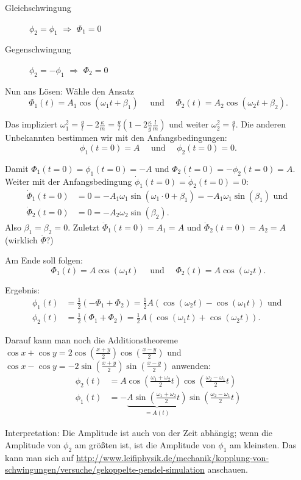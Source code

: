 \begin{description}
	\item[Gleichschwingung] $\phi_2 = \phi_1$ $\Longrightarrow$ $\Phi_1 = 0$
	\item[Gegenschwingung] $\phi_2 = -\phi_1$ $\Longrightarrow$ $\Phi_2 = 0$ 
\end{description}

Nun ans Lösen: Wähle den Ansatz 
\[
	\Phi_1(t) = A_1 \cos (\omega_1 t + \beta_1) 
	\quad \text{ und } \quad 
	\Phi_2(t) = A_2 \cos (\omega_2 t + \beta_2)
	\text{.}
\]

Das impliziert $\omega_1^2 = \frac{g}{l} - 2 \frac{\kappa}{m} = \frac{g}{l} \left( 1 - 2 \frac{\kappa}{g} \frac{l}{m} \right)$ und weiter $\omega_2^2 = \frac{g}{l}$. Die anderen Unbekannten bestimmen wir mit den Anfangsbedingungen:
\[
	\phi_1(t = 0) = A
	\quad \text{ und } \quad 
	\phi_2(t = 0) = 0
	\text{.}
\]

Damit $\Phi_1(t = 0) = \phi_1(t = 0) = -A$ und $\Phi_2(t = 0) = - \phi_2(t = 0) = A$. Weiter mit der Anfangsbedingung $\dot{\phi}_1(t = 0) = \dot{\phi}_2(t = 0) = 0$: 
\begin{align*}
	\dot{\Phi}_1(t = 0) &= 0 
	= - A_1 \omega_1 \sin (\omega_1 \cdot 0 + \beta_1) 
	= - A_1 \omega_1 \sin(\beta_1) \text{ und } \\
	\dot{\Phi}_2(t = 0) &= 0 
	= -A_2 \omega_2 \sin(\beta_2) \text{.}
\end{align*}
Also $\beta_1 = \beta_2 = 0$. Zuletzt $\ddot{\Phi}_1(t = 0) = A_1 = A$ und $\ddot{\Phi}_2(t = 0) = A_2 = A$ (wirklich $\ddot{\Phi}$?) 

Am Ende soll folgen: 
\[
	\Phi_1(t) = A \cos (\omega_1 t) 
	\quad \text{ und } \quad 
	\Phi_2(t) = A \cos (\omega_2 t)
	\text{.}
\]

Ergebnis:
\begin{align*}
	\phi_1(t) &= \frac{1}{2} (- \Phi_1 + \Phi_2) = \frac{1}{2} A (\cos(\omega_2 t) - \cos(\omega_1 t)) \text{ und } \\
	\phi_2(t) &= \frac{1}{2} (\Phi_1 + \Phi_2) = \frac{1}{2} A (\cos(\omega_1 t) + \cos (\omega_2 t))
	\text{.}
\end{align*}

Darauf kann man noch die Additionstheoreme $\cos x + \cos y = 2 \cos \left( \frac{x + y}{2} \right) \cos \left( \frac{x - y}{2} \right)$ und $\cos x - \cos y = - 2 \sin \left( \frac{x + y}{2} \right) \sin \left( \frac{x - y}{2} \right)$ anwenden:
\begin{align*}
	\phi_2(t) &= A \cos \left( \frac{\omega_1 + \omega_2}{2} t \right) \cos \left( \frac{\omega_2 - \omega_1}{2} t \right) \\
	\phi_1(t) &= - \underbrace{A \sin \left( \frac{\omega_1 + \omega_2}{2} t \right)}_{= A(t)} \sin \left( \frac{\omega_2 - \omega_1}{2} t \right)
\end{align*}

Interpretation: Die Amplitude ist auch von der Zeit abhängig; wenn die Amplitude von $\phi_2$ am größten ist, ist die Amplitude von $\phi_1$ am kleinsten. Das kann man sich auf \url{http://www.leifiphysik.de/mechanik/kopplung-von-schwingungen/versuche/gekoppelte-pendel-simulation} anschauen.
